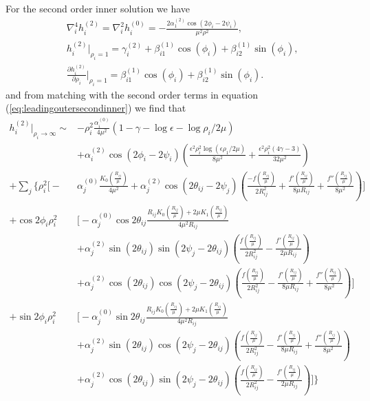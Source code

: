 For the second order inner solution we have
\begin{align}
    &\nabla_i^{4}h_i^{(2)}=\nabla_i^{2}h_i^{(0)}=-\frac{2\alpha^{(2)}_{1}\cos(2\phi_i-2\psi_i)}{\mu^2\rho^2}, \label{secondinner}\\
    &h_i^{(2)}\biggr\rvert_{\rho_i=1}=\gamma_i^{(2)}+\beta^{(1)}_{i1}\cos(\phi_i)+\beta^{(1)}_{i2}\sin(\phi_i), \\
    &\frac{\partial h_i^{(2)}}{\partial \rho_i}\biggr\rvert_{\rho_i=1}=\beta^{(1)}_{i1}\cos(\phi_i)+\beta^{(1)}_{i2}\sin(\phi_i).
\end{align}
and from matching with the second order terms in equation (\ref{eq:leadingoutersecondinner}) we find that
\begin{equation}
    \begin{split}  
        h_i^{(2)}\biggr\rvert_{\rho_i\to\infty} \sim& -\rho_{i}^2 \frac{\alpha_{i}^{(0)}}{4\mu^2}(1-\gamma - \log \epsilon - \log \rho_{i}/2\mu) \\
        &+ \alpha_{i}^{(2)}\cos(2\phi_i-2\psi_i)\left(\frac{\epsilon^2\rho_{i}^2\log(\epsilon\rho_{1}/2\mu)}{8\mu^2} + \frac{\epsilon^2\rho_{i}^2(4\gamma - 3)}{32\mu^2}\right)\\
        +\sum_{j}\Bigg\{\rho_i^2\Bigg[-&\alpha_{j}^{(0)}\frac{K_0\left(\frac{R_{ij}}{\mu}\right)}{{4\mu^2}}+\alpha_{j}^{(2)}\cos(2\theta_{ij}-2\psi_j)\left(\frac{-f\left(\frac{R_{ij}}{\mu}\right)}{2R_{ij}^2}+\frac{f'\left(\frac{R_{ij}}{\mu}\right)}{8 \mu R_{ij}}+\frac{f''\left(\frac{R_{ij}}{\mu}\right)}{8 \mu^2}\right)\Bigg]\\
        +\cos2\phi_i\rho_i^2&\Bigg[-\alpha_{j}^{(0)}\cos2\theta_{ij}\frac{R_{ij}K_0\left(\frac{R_{ij}}{\mu}\right)+2\mu K_1\left(\frac{R_{ij}}{\mu}\right)}{{4\mu^2}R_{ij}}\\
        &+\alpha_{j}^{(2)}\sin(2\theta_{ij})\sin(2\psi_j-2\theta_{ij})\left(\frac{f\left(\frac{R_{ij}}{\mu}\right)}{2R_{ij}^2}-\frac{f'\left(\frac{R_{ij}}{\mu}\right)}{2\mu R_{ij}}\right)\\
        & +\alpha_{j}^{(2)}\cos(2\theta_{ij})\cos(2\psi_j-2\theta_{ij})\left(\frac{f\left(\frac{R_{ij}}{\mu}\right)}{2 R_{ij}^2}-\frac{f'\left(\frac{R_{ij}}{\mu}\right)}{8 \mu R_{ij}}+\frac{f''\left(\frac{R_{ij}}{\mu}\right)}{8 \mu^2}\right)\Bigg]\\
        +\sin2\phi_i\rho_i^2&\Bigg[-\alpha_{j}^{(0)}\sin2\theta_{ij}\frac{R_{ij}K_0\left(\frac{R_{ij}}{\mu}\right)+2\mu K_1\left(\frac{R_{ij}}{\mu}\right)}{{4\mu^2}R_{ij}}\\
        &+ \alpha_{j}^{(2)}\sin(2\theta_{ij})\cos(2\psi_j-2\theta_{ij})\left(\frac{f\left(\frac{R_{ij}}{\mu}\right)}{2R_{ij}^2}-\frac{f'\left(\frac{R_{ij}}{\mu}\right)}{8 \mu R_{ij}}+\frac{f''\left(\frac{R_{ij}}{\mu}\right)}{8 \mu^2}\right)\\
        & +\alpha_{j}^{(2)}\cos(2\theta_{ij})\sin(2\psi_j-2\theta_{ij})\left(\frac{f\left(\frac{R_{ij}}{\mu}\right)}{2 R_{ij}^2}-\frac{f'\left(\frac{R_{ij}}{\mu}\right)}{2 \mu R_{ij}}\right)\Bigg]\Bigg\}\\
    \end{split}
\end{equation}
